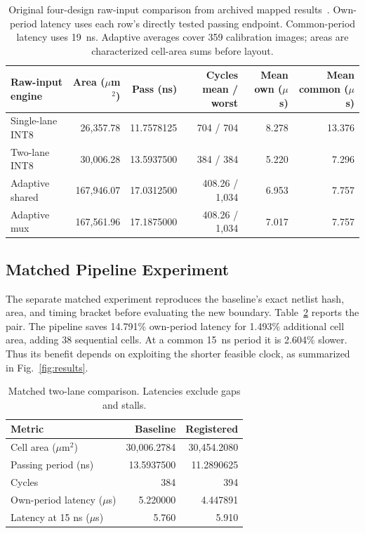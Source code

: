 \begin{table}[t]
\caption{Original four-design raw-input comparison from archived mapped results~\cite{flexmac}. Own-period latency uses each row's directly tested passing endpoint. Common-period latency uses 19~ns. Adaptive averages cover 359 calibration images; areas are characterized cell-area sums before layout.}
\label{tab:engines}
\centering
\begin{tabular}{lrrrrr}
\toprule
Raw-input engine & Area ($\mu$m$^2$) & Pass (ns) & Cycles mean / worst & Mean own ($\mu$s) & Mean common ($\mu$s) \\
\midrule
Single-lane INT8 & 26,357.78 & 11.7578125 & 704 / 704 & 8.278 & 13.376 \\
Two-lane INT8 & 30,006.28 & 13.5937500 & 384 / 384 & 5.220 & 7.296 \\
Adaptive shared & 167,946.07 & 17.0312500 & 408.26 / 1,034 & 6.953 & 7.757 \\
Adaptive mux & 167,561.96 & 17.1875000 & 408.26 / 1,034 & 7.017 & 7.757 \\
\bottomrule
\end{tabular}
\end{table}

\subsection{Matched Pipeline Experiment}
The separate matched experiment reproduces the baseline's exact netlist hash, area, and timing bracket before evaluating the new boundary. Table~\ref{tab:pipeline} reports the pair. The pipeline saves 14.791\% own-period latency for 1.493\% additional cell area, adding 38 sequential cells. At a common 15~ns period it is 2.604\% slower. Thus its benefit depends on exploiting the shorter feasible clock, as summarized in Fig.~\ref{fig:results}.

\begin{table}[t]
\caption{Matched two-lane comparison. Latencies exclude gaps and stalls.}
\label{tab:pipeline}
\centering
\begin{tabular}{lrr}
\toprule
Metric & Baseline & Registered \\
\midrule
Cell area ($\mu$m$^2$) & 30,006.2784 & 30,454.2080 \\
Passing period (ns) & 13.5937500 & 11.2890625 \\
Cycles & 384 & 394 \\
Own-period latency ($\mu$s) & 5.220000 & 4.447891 \\
Latency at 15 ns ($\mu$s) & 5.760 & 5.910 \\
\bottomrule
\end{tabular}
\end{table}

